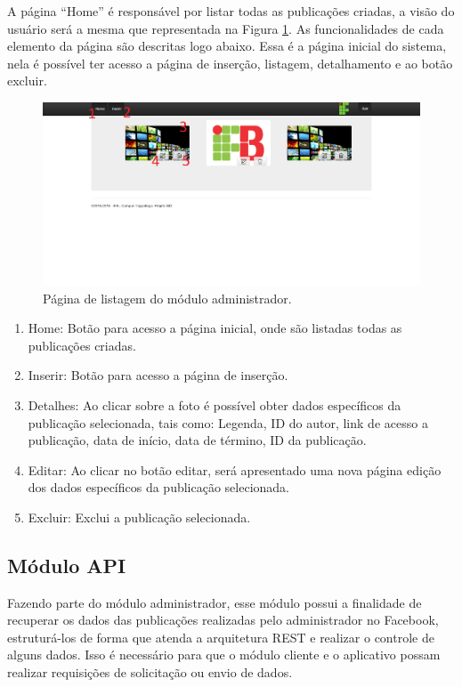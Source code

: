A página ``Home'' é responsável por listar todas as publicações criadas, a visão do usuário será a mesma que representada na Figura \ref{fig:administrador2}. As funcionalidades de cada elemento da página são descritas logo abaixo. Essa é a página inicial do sistema, nela é possível ter acesso a página de inserção, listagem, detalhamento e ao botão excluir.

\begin{figure}[H]
\centering
\includegraphics[scale=0.4]{figuras/administrador2}
\caption{Página de listagem  do módulo administrador.}
\label{fig:administrador2}
\end{figure}

\begin{enumerate}
   \item Home: Botão para acesso a página inicial, onde são listadas todas as publicações criadas.
   \item Inserir: Botão para acesso a página de inserção.
   \item Detalhes: Ao clicar sobre a foto é possível obter dados específicos da publicação selecionada, tais como: Legenda, ID do autor, link de acesso a publicação, data de início, data de término, ID da publicação.
   \item Editar: Ao clicar no botão editar, será apresentado uma nova página edição dos dados específicos da publicação selecionada.
   \item Excluir: Exclui a publicação selecionada.
 \end{enumerate}

\subsection{Módulo API}
Fazendo parte do módulo administrador, esse módulo possui a finalidade de recuperar os dados das publicações realizadas pelo administrador no Facebook, estruturá-los de forma que atenda a arquitetura REST e realizar o controle de alguns dados. Isso é necessário para que o módulo cliente e o aplicativo possam realizar requisições de solicitação ou envio de dados.

